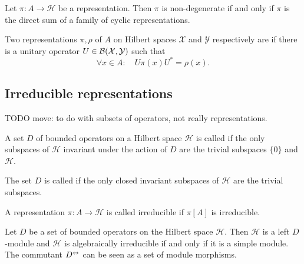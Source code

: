\begin{proposition}
Let $\pi:A\to \mathcal{H}$ be a representation. Then $\pi$ is non-degenerate \textup{if and only if} $\pi$ is the direct sum of a family of cyclic representations.
\end{proposition}

\begin{definition}
Two representations $\pi,\rho$ of $A$ on Hilbert spaces $\mathcal{X}$ and $\mathcal{Y}$ respectively are  if there is a unitary operator $U\in\operatorname{\mathcal{B}}(\mathcal{X}, \mathcal{Y})$ such that
\[ \forall x\in A: \quad U\pi(x)U^* = \rho(x). \]
\end{definition}

\subsection{Irreducible representations}
TODO move: to do with subsets of operators, not really representations.

\begin{definition}
A set $D$ of bounded operators on a Hilbert space $\mathcal{H}$ is called  if the only subspaces of $\mathcal{H}$ invariant under the action of $D$ are the trivial subspaces $\{0\}$ and $\mathcal{H}$.

The set $D$ is called  if the only closed invariant subspaces of $\mathcal{H}$ are the trivial subspaces.

A representation $\pi: A\to\mathcal{H}$ is called irreducible if $\pi[A]$ is irreducible.
\end{definition}


Let $D$ be a set of bounded operators on the Hilbert space $\mathcal{H}$. Then $\mathcal{H}$ is a left $D$-module and $\mathcal{H}$ is algebraically irreducible if and only if it is a simple module. The commutant $D^\leftrightarrow$ can be seen as a set of module morphisms.

